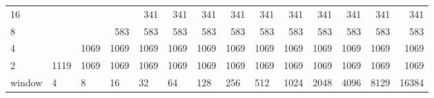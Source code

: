 \begin{table}[h]
{\begin{tabular}{lrrrrrrrrrrrrr}
		\multicolumn{1}{|l|}{16} &  &  &  & \cellcolor[HTML]{E60000}341 & \cellcolor[HTML]{E60000}341 & \cellcolor[HTML]{E60000}341 & \cellcolor[HTML]{E60000}341 & \cellcolor[HTML]{E60000}341 & \cellcolor[HTML]{E60000}341 & \cellcolor[HTML]{E60000}341 & \cellcolor[HTML]{E60000}341 & \cellcolor[HTML]{E60000}341 & \cellcolor[HTML]{E60000}341 \\ \cline{1-1}
		\multicolumn{1}{|l|}{8} &  &  & \cellcolor[HTML]{4C00E6}583 & \cellcolor[HTML]{4C00E6}583 & \cellcolor[HTML]{4C00E6}583 & \cellcolor[HTML]{4C00E6}583 & \cellcolor[HTML]{4C00E6}583 & \cellcolor[HTML]{4C00E6}583 & \cellcolor[HTML]{4C00E6}583 & \cellcolor[HTML]{4C00E6}583 & \cellcolor[HTML]{4C00E6}583 & \cellcolor[HTML]{4C00E6}583 & \cellcolor[HTML]{4C00E6}583 \\ \cline{1-1}
		\multicolumn{1}{|l|}{4} &  & \cellcolor[HTML]{4C00E6}1069 & \cellcolor[HTML]{4C00E6}1069 & \cellcolor[HTML]{4C00E6}1069 & \cellcolor[HTML]{4C00E6}1069 & \cellcolor[HTML]{4C00E6}1069 & \cellcolor[HTML]{4C00E6}1069 & \cellcolor[HTML]{4C00E6}1069 & \cellcolor[HTML]{4C00E6}1069 & \cellcolor[HTML]{4C00E6}1069 & \cellcolor[HTML]{4C00E6}1069 & \cellcolor[HTML]{4C00E6}1069 & \cellcolor[HTML]{4C00E6}1069 \\ \cline{1-1}
		\multicolumn{1}{|l|}{2} & \cellcolor[HTML]{4C00E6}1119 & \cellcolor[HTML]{4C00E6}1069 & \cellcolor[HTML]{4C00E6}1069 & \cellcolor[HTML]{4C00E6}1069 & \cellcolor[HTML]{4C00E6}1069 & \cellcolor[HTML]{4C00E6}1069 & \cellcolor[HTML]{4C00E6}1069 & \cellcolor[HTML]{4C00E6}1069 & \cellcolor[HTML]{4C00E6}1069 & \cellcolor[HTML]{4C00E6}1069 & \cellcolor[HTML]{4C00E6}1069 & \cellcolor[HTML]{4C00E6}1069 & \cellcolor[HTML]{4C00E6}1069 \\ \hline
		\multicolumn{1}{l|}{window} & \multicolumn{1}{l|}{4} & \multicolumn{1}{l|}{8} & \multicolumn{1}{l|}{16} & \multicolumn{1}{l|}{32} & \multicolumn{1}{l|}{64} & \multicolumn{1}{l|}{128} & \multicolumn{1}{l|}{256} & \multicolumn{1}{l|}{512} & \multicolumn{1}{l|}{1024} & \multicolumn{1}{l|}{2048} & \multicolumn{1}{l|}{4096} & \multicolumn{1}{l|}{8129} & \multicolumn{1}{l|}{16384} \\ \cline{2-14} 
	\end{tabular}
}
\end{table}